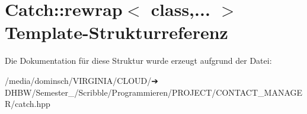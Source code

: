 \hypertarget{structCatch_1_1rewrap}{}\section{Catch\+:\+:rewrap$<$ class,... $>$ Template-\/\+Strukturreferenz}
\label{structCatch_1_1rewrap}


Die Dokumentation für diese Struktur wurde erzeugt aufgrund der Datei\+:\begin{DoxyCompactItemize}
\item 
/media/dominsch/\+V\+I\+R\+G\+I\+N\+I\+A/\+C\+L\+O\+U\+D/➔ D\+H\+B\+W/\+Semester\+\_/\+Scribble/\+Programmieren/\+P\+R\+O\+J\+E\+C\+T/\+C\+O\+N\+T\+A\+C\+T\+\_\+\+M\+A\+N\+A\+G\+E\+R/catch.\+hpp\end{DoxyCompactItemize}

